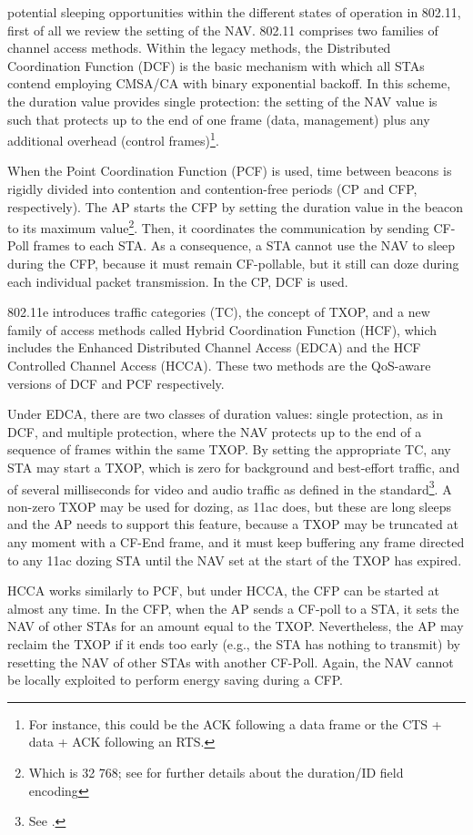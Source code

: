 \documentclass[twoside,nohyper]{tufte-book}
\theoremstyle{definition}
\theoremstyle{definition}
\theoremstyle{definition}
\theoremstyle{remark}
\begin{document}
 potential sleeping opportunities within
the different states of operation in 802.11, first of all we review the
setting of the NAV. 802.11 comprises two families of channel access
methods. Within the legacy methods, the Distributed Coordination
Function (DCF) is the basic mechanism with which all STAs contend
employing CMSA/CA with binary exponential backoff. In this scheme, the
duration value provides single protection: the setting of the NAV value
is such that protects up to the end of one frame (data, management) plus
any additional overhead (control frames)\footnote{For instance, this
  could be the ACK following a data frame or the CTS + data + ACK
  following an RTS.}.

When the Point Coordination Function (PCF) is used, time between beacons
is rigidly divided into contention and contention-free periods (CP and
CFP, respectively). The AP starts the CFP by setting the duration value
in the beacon to its maximum value\footnote{Which is 32 768; see
  \citet[Table 8-3]{80211} for further details about the duration/ID
  field encoding}. Then, it coordinates the communication by sending
CF-Poll frames to each STA. As a consequence, a STA cannot use the NAV
to sleep during the CFP, because it must remain CF-pollable, but it
still can doze during each individual packet transmission. In the CP,
DCF is used.

802.11e introduces traffic categories (TC), the concept of TXOP, and a
new family of access methods called Hybrid Coordination Function (HCF),
which includes the Enhanced Distributed Channel Access (EDCA) and the
HCF Controlled Channel Access (HCCA). These two methods are the
QoS-aware versions of DCF and PCF respectively.

Under EDCA, there are two classes of duration values: single protection,
as in DCF, and multiple protection, where the NAV protects up to the end
of a sequence of frames within the same TXOP. By setting the appropriate
TC, any STA may start a TXOP, which is zero for background and
best-effort traffic, and of several milliseconds for video and audio
traffic as defined in the standard\footnote{See \citet[Table
  8-105]{80211}.}. A non-zero TXOP may be used for dozing, as 11ac does,
but these are long sleeps and the AP needs to support this feature,
because a TXOP may be truncated at any moment with a CF-End frame, and
it must keep buffering any frame directed to any 11ac dozing STA until
the NAV set at the start of the TXOP has expired.

HCCA works similarly to PCF, but under HCCA, the CFP can be started at
almost any time. In the CFP, when the AP sends a CF-poll to a STA, it
sets the NAV of other STAs for an amount equal to the TXOP.
Nevertheless, the AP may reclaim the TXOP if it ends too early (e.g.,
the STA has nothing to transmit) by resetting the NAV of other STAs with
another CF-Poll. Again, the NAV cannot be locally exploited to perform
energy saving during a CFP.
\end{document}
